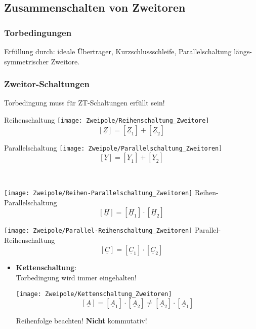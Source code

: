 \subsection{Zusammenschalten von Zweitoren}
\subsubsection{Torbedingungen}
\small
Erfüllung durch: ideale \"Ubertrager, Kurzschlussschleife, Parallelschaltung längs-symmetrischer Zweitore.
\normalsize
\subsubsection{Zweitor-Schaltungen}
Torbedingung muss für ZT-Schaltungen erfüllt sein!\\

\begin{minipage}{0.45\columnwidth}
		\centering Reihenschaltung
	\texttt{[image: Zweipole/Reihenschaltung\_Zweitore]}
	\[
	\left[ \underline{Z} \right] = \left[ \underline{Z}_1 \right] + \left[ \underline{Z}_2 \right]
	\]
\end{minipage}
\begin{minipage}{0.45\columnwidth}
	\centering Parallelschaltung
	\texttt{[image: Zweipole/Parallelschaltung\_Zweitoren]}
	\[
	\left[ \underline{Y} \right] = \left[ \underline{Y}_1 \right] + \left[ \underline{Y}_2 \right]
	\]
\end{minipage}  \\

\begin{minipage}{0.45\columnwidth}
			\texttt{[image: Zweipole/Reihen-Parallelschaltung\_Zweitoren]}
			 Reihen-Parallelschaltung
	\[
	\left[ \underline{H} \right] = \left[ \underline{H}_1 \right] \cdot \left[ \underline{H}_2 \right]
	\]
\end{minipage}
\begin{minipage}{0.45\columnwidth}
			\texttt{[image: Zweipole/Parallel-Reihenschaltung\_Zweitoren]}
			Parallel-Reihenschaltung
	\[
	\left[ \underline{C} \right] = \left[ \underline{C}_1 \right] \cdot \left[ \underline{C}_2 \right]
	\]
\end{minipage}

\begin{itemize}
	\item \textbf{Kettenschaltung}:\\
	Torbedingung wird immer eingehalten!
	\begin{center}
		\texttt{[image: Zweipole/Kettenschaltung\_Zweitoren]}
		\[
		\left[ \underline{A} \right] = \left[ \underline{A}_1 \right] \cdot \left[ \underline{A}_2 \right] \neq \left[ \underline{A}_2
		\right] \cdot \left[ \underline{A}_1 \right]
		\]
	\end{center}
	\normalsize Reihenfolge beachten! \textbf{Nicht} kommutativ!
\end{itemize}
